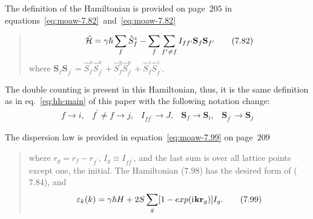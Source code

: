     The definition of the Hamiltonian is provided on page~$205$ in equations~\eqref{eq:moaw-7.82}~and~\eqref{eq:moaw-7.82}

    \begin{quote}
        \begin{equation}
            \hat{\mathcal{H}} = \gamma\hbar\sum_{f}\hat{S}_f^z - \sum_f\sum_{f^{\prime} \ne f} I_{ff^{\prime}}\mathbf{S}_f\mathbf{S}_{f^{\prime}} \label{eq:moaw-7.82} \tag{7.82}
        \end{equation}
        where $\mathbf{S}_f\mathbf{S}_{f^{\prime}} = \hat{S}_f^x\hat{S}_{f^{\prime}}^x + \hat{S}_f^y\hat{S}_{f^{\prime}}^y + \hat{S}_f^z\hat{S}_{f^{\prime}}^z$.
    \end{quote}
    The double counting is present in this Hamiltonian, thus, it is the same definition as in eq.~\eqref{eq:hh-main} of this paper with the following notation change:
    \begin{equation}
        \begin{matrix}
            f \rightarrow i, & 
            f^{\prime} \ne f \rightarrow j, & 
            I_{ff^{\prime}} \rightarrow J, & 
            \mathbf{S}_f \rightarrow \mathbf{S}_i, &
            \mathbf{S}_{f^{\prime}} \rightarrow \mathbf{S}_j
        \end{matrix}
    \end{equation}

    The dispersion law is provided in equation~\eqref{eq:moaw-7.99} on page~$209$
    \begin{quote}
        where $r_g = r_f - r_{f^{\prime}}$, $I_g \equiv I_{ff^{\prime}}$, and the last sum is over all lattice points except one, the initial. 
        The Hamiltonian ($7.98$) has the desired form of ($7.84$), and
        \begin{equation}
            \varepsilon_k(k) = \gamma\hbar H + 2S \sum_g [1 - exp(\mathrm{i}\mkern1mu \mathbf{k}\mathbf{r}_g)]I_g. \label{eq:moaw-7.99} \tag{7.99}
        \end{equation}
    \end{quote}

